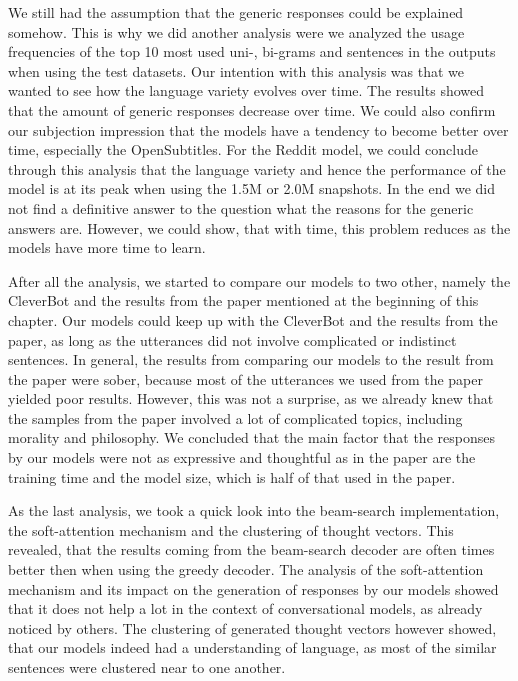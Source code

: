 We still had the assumption that the generic responses could be explained somehow. This is why we did another analysis were we analyzed the usage frequencies of the top 10 most used uni-, bi-grams and sentences in the outputs when using the test datasets. Our intention with this analysis was that we wanted to see how the language variety evolves over time. The results showed that the amount of generic responses decrease over time. We could also confirm our subjection impression that the models have a tendency to become better over time, especially the OpenSubtitles. For the Reddit model, we could conclude through this analysis that the language variety and hence the performance of the model is at its peak when using the 1.5M or 2.0M snapshots. In the end we did not find a definitive answer to the question what the reasons for the generic answers are. However, we could show, that with time, this problem reduces as the models have more time to learn.

After all the analysis, we started to compare our models to two other, namely the CleverBot and the results from the paper mentioned at the beginning of this chapter. Our models could keep up with the CleverBot and the results from the paper, as long as the utterances did not involve complicated or indistinct sentences. In general, the results from comparing our models to the result from the paper were sober, because most of the utterances we used from the paper yielded poor results. However, this was not a surprise, as we already knew that the samples from the paper involved a lot of complicated topics, including morality and philosophy. We concluded that the main factor that the responses by our models were not as expressive and thoughtful as in the paper are the training time and the model size, which is half of that used in the paper.

As the last analysis, we took a quick look into the beam-search implementation, the soft-attention mechanism and the clustering of thought vectors. This revealed, that the results coming from the beam-search decoder are often times better then when using the greedy decoder. The analysis of the soft-attention mechanism and its impact on the generation of responses by our models showed that it does not help a lot in the context of conversational models, as already noticed by others. The clustering of generated thought vectors however showed, that our models indeed had a understanding of language, as most of the similar sentences were clustered near to one another.

